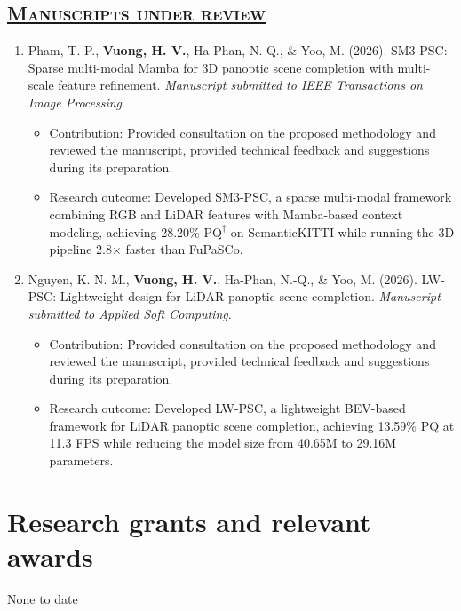 \documentclass[a4paper,12pt]{article}
\begin{document}
\subsection*{\scshape\underline{Manuscripts under review}}
\begin{enumerate}[
    leftmargin=*,
    labelsep=0.5em,
    align=left
]

  \item
  Pham, T. P., \textbf{Vuong, H. V.}, Ha-Phan, N.-Q., \& Yoo, M. (2026).
  SM3-PSC: Sparse multi-modal Mamba for 3D panoptic scene completion with multi-scale feature refinement.
  \textit{Manuscript submitted to IEEE Transactions on Image Processing}.

\begin{itemize}[leftmargin=1.5em]
    \item Contribution: Provided consultation on the proposed methodology and reviewed the manuscript, provided technical feedback and suggestions during its preparation.
    \item Research outcome: Developed SM3-PSC, a sparse multi-modal
    framework combining RGB and LiDAR features with Mamba-based context modeling, achieving 28.20\% $\mathrm{PQ}^\dagger$ on SemanticKITTI while running the 3D pipeline 2.8$\times$ faster than FuPaSCo.
\end{itemize}

  \item
  Nguyen, K. N. M., \textbf{Vuong, H. V.}, Ha-Phan, N.-Q., \& Yoo, M. (2026).
  LW-PSC: Lightweight design for LiDAR panoptic scene completion.
  \textit{Manuscript submitted to Applied Soft Computing}.

\begin{itemize}[leftmargin=1.5em]
    \item Contribution: Provided consultation on the proposed methodology and reviewed the manuscript, provided technical feedback and suggestions during its preparation.
    \item Research outcome: Developed LW-PSC, a lightweight BEV-based
    framework for LiDAR panoptic scene completion, achieving 13.59\% PQ at 11.3 FPS while reducing the model size from 40.65M to 29.16M parameters.
\end{itemize}

\end{enumerate}
\vspace{-6mm}


\section{\textbf{Research grants and relevant awards}}
\vspace{0.5mm}
None to date
\end{document}
